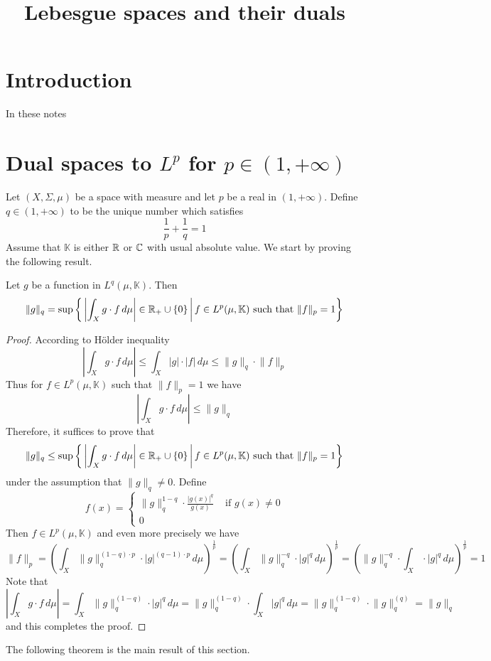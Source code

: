 



\title{Lebesgue spaces and their duals}
\date{}
\maketitle


\section{Introduction}
\noindent
In these notes 



\section{Dual spaces to $L^p$ for $p \in (1,+\infty)$}
\noindent
Let $(X,\Sigma,\mu)$ be a space with measure and let $p$ be a real in $(1,+\infty)$. Define $q \in (1,+\infty)$ to be the unique number which satisfies
$$\frac{1}{p} + \frac{1}{q} = 1$$
Assume that $\mathbb{K}$ is either ${\mathbb R}$ or ${\mathbb C}$ with usual absolute value. We start by proving the following result.

\begin{proposition}\label{proposition:norm_of_standard_functional_for_positive_p}
Let $g$ be a function in $L^q(\mu,\mathbb{K})$. Then
$$\lVert g\rVert_q = \sup \bigg\{\left|\int_X g\cdot f\,d\mu\right|\in {\mathbb R}_+\cup \{0\}\,\bigg|\,f\in L^p(\mu,\mathbb{K})\mbox{ such that }\lVert f\rVert_p = 1\bigg\}$$
\end{proposition}
\begin{proof}
According to H{\"o}lder inequality
$$\left|\int_X g\cdot f\,d\mu\right| \leq \int_X |g|\cdot |f|\,d\mu \leq \lVert g\rVert_q \cdot \lVert f\rVert_p$$
Thus for $f \in L^p(\mu,\mathbb{K})$ such that $\lVert f\rVert_p = 1$ we have
$$\left|\int_X g\cdot f\,d\mu\right| \leq \lVert g\rVert_q$$
Therefore, it suffices to prove that 
$$\lVert g\rVert_q \leq \sup \bigg\{\left|\int_X g\cdot f\,d\mu\right|\in {\mathbb R}_+\cup \{0\}\,\bigg|\,f\in L^p(\mu,\mathbb{K})\mbox{ such that }\lVert f\rVert_p = 1\bigg\}$$
under the assumption that $\lVert g \rVert_q \neq 0$. Define
$$f(x) = \begin{cases}
\lVert g \rVert_q^{1 - q}\cdot \frac{|g(x)|^q}{g(x)}&\mbox{ if }g(x) \neq 0\\
0  
\end{cases}
$$
Then $f \in L^p(\mu,\mathbb{K})$ and even more precisely we have
$$\lVert f \rVert_p = \left(\int_X\lVert g \rVert_q^{(1 - q)\cdot p}\cdot |g|^{(q-1)\cdot p}\,d\mu\right)^{\frac{1}{p}} = \left(\int_X\lVert g \rVert_q^{-q}\cdot |g|^{q}\,d\mu\right)^{\frac{1}{p}} = \left(\lVert g \rVert_q^{-q}\cdot \int_X\cdot |g|^{q}\,d\mu\right)^{\frac{1}{p}} = 1
$$
Note that
$$\left|\int_X g\cdot f\,d\mu\right| = \int_X \lVert g \rVert_q^{(1 - q)}\cdot |g|^{q}\,d\mu = \lVert g \rVert_q^{(1 - q)}\cdot \int_X |g|^{q}\,d\mu = \lVert g \rVert_q^{(1 - q)}\cdot \lVert g \rVert_q^{(q)} = \lVert g \rVert_q $$
and this completes the proof.
\end{proof}
\noindent
The following theorem is the main result of this section.

